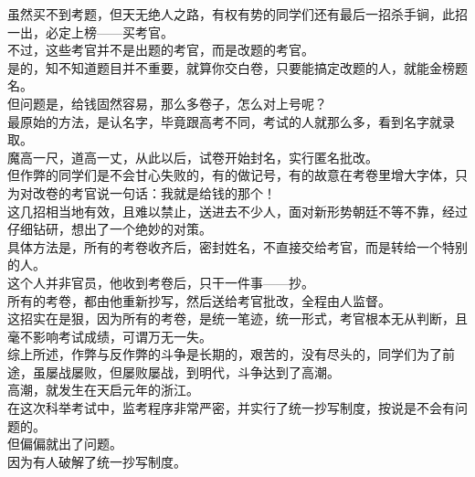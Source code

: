 \begin{multicols}{\theparacolNo}
虽然买不到考题，但天无绝人之路，有权有势的同学们还有最后一招杀手锏，此招一出，必定上榜——买考官。\\

不过，这些考官并不是出题的考官，而是改题的考官。\\

是的，知不知道题目并不重要，就算你交白卷，只要能搞定改题的人，就能金榜题名。\\

但问题是，给钱固然容易，那么多卷子，怎么对上号呢？\\

最原始的方法，是认名字，毕竟跟高考不同，考试的人就那么多，看到名字就录取。\\

魔高一尺，道高一丈，从此以后，试卷开始封名，实行匿名批改。\\

但作弊的同学们是不会甘心失败的，有的做记号，有的故意在考卷里增大字体，只为对改卷的考官说一句话：我就是给钱的那个！\\

这几招相当地有效，且难以禁止，送进去不少人，面对新形势朝廷不等不靠，经过仔细钻研，想出了一个绝妙的对策。\\

具体方法是，所有的考卷收齐后，密封姓名，不直接交给考官，而是转给一个特别的人。\\

这个人并非官员，他收到考卷后，只干一件事——抄。\\

所有的考卷，都由他重新抄写，然后送给考官批改，全程由人监督。\\

这招实在是狠，因为所有的考卷，是统一笔迹，统一形式，考官根本无从判断，且毫不影响考试成绩，可谓万无一失。\\

综上所述，作弊与反作弊的斗争是长期的，艰苦的，没有尽头的，同学们为了前途，虽屡战屡败，但屡败屡战，到明代，斗争达到了高潮。\\

高潮，就发生在天启元年的浙江。\\

在这次科举考试中，监考程序非常严密，并实行了统一抄写制度，按说是不会有问题的。\\

但偏偏就出了问题。\\

因为有人破解了统一抄写制度。\\


\end{multicols}
